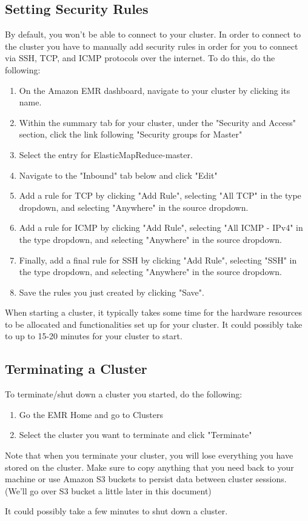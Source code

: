 \documentclass{article}
\begin{document}
\subsection{Setting Security Rules}
\noindent By default, you won't be able to connect to your cluster. In order to connect to the cluster you have to manually add security rules in order for you to connect via SSH, TCP, and ICMP protocols over the internet. To do this, do the following:
\begin{enumerate}
     \item On the Amazon EMR dashboard, navigate to your cluster by clicking its name.
     \item Within the summary tab for your cluster, under the "Security and Access" section, click the link following "Security groups for Master"
     \item Select the entry for ElasticMapReduce-master.
     \item Navigate to the "Inbound" tab below and click "Edit"
     \item Add a rule for TCP by clicking "Add Rule", selecting "All TCP" in the type dropdown, and selecting "Anywhere" in the source dropdown.
     \item Add a rule for ICMP by clicking "Add Rule", selecting "All ICMP - IPv4" in the type dropdown, and selecting "Anywhere" in the source dropdown.
     \item Finally, add a final rule for SSH by clicking "Add Rule", selecting "SSH" in the type dropdown, and selecting "Anywhere" in the source dropdown.
     \item Save the rules you just created by clicking "Save".
\end{enumerate}
\begin{info}
When starting a cluster, it typically takes some time for the hardware resources to be allocated and functionalities set up for your cluster. It could possibly take to up to 15-20 minutes for your cluster to start.
\end{info}
\subsection{Terminating a Cluster}
To terminate/shut down a cluster you started, do the following:
\begin{enumerate}
    \item Go the EMR Home and go to Clusters
    \item Select the cluster you want to terminate and click "Terminate"
\end{enumerate}
\begin{info}
Note that when you terminate your cluster, you will lose everything you have stored on the cluster. Make sure to copy anything that you need back to your machine or use Amazon S3 buckets to persist data between cluster sessions. (We'll go over S3 bucket a little later in this document)
\end{info}
\begin{info}
It could possibly take a few minutes to shut down a cluster.
\end{info}
\end{document}

